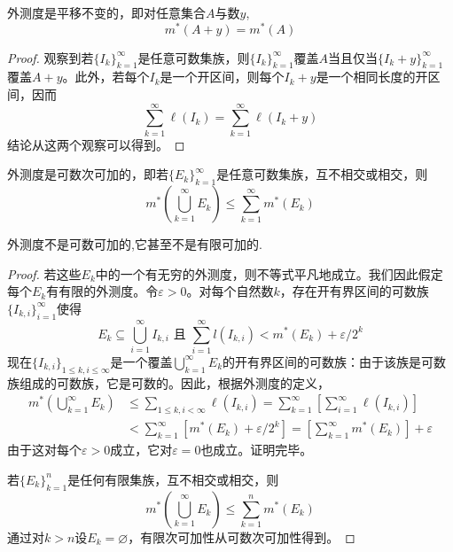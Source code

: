 \documentclass[lang=cn,newtx,10pt,scheme=chinese]{../Template/elegantbook}
\begin{document}
\begin{proposition}[Lebesgue外测度的平移不变性]\label{proposition:Lebesgue外测度的平移不变性}
外测度是平移不变的，即对任意集合\(A\)与数\(y\),
\[m^*(A + y)=m^*(A)\]
\end{proposition}
\begin{proof}
  观察到若\(\{I_k\}_{k = 1}^{\infty}\)是任意可数集族，则\(\{I_k\}_{k = 1}^{\infty}\)覆盖\(A\)当且仅当\(\{I_k + y\}_{k = 1}^{\infty}\)覆盖\(A + y\)。此外，若每个\(I_k\)是一个开区间，则每个\(I_k + y\)是一个相同长度的开区间，因而
\[
\sum_{k = 1}^{\infty}\ell(I_k)=\sum_{k = 1}^{\infty}\ell(I_k + y)
\]
结论从这两个观察可以得到。
\end{proof}

\begin{proposition}[Lebesgue外测度的可数次可加性]\label{proposition:Lebesgue外测度的可数次可加性}
  外测度是可数次可加的，即若\(\{E_k\}_{k = 1}^{\infty}\)是任意可数集族，互不相交或相交，则
\[
m^*\left(\bigcup_{k = 1}^{\infty}E_k\right)\leqslant\sum_{k = 1}^{\infty}m^*(E_k)
\]
\end{proposition}
\begin{remark}
  外测度不是可数可加的,它甚至不是有限可加的.
\end{remark}
\begin{proof}
  若这些\(E_k\)中的一个有无穷的外测度，则不等式平凡地成立。我们因此假定每个\(E_k\)有有限的外测度。令\(\varepsilon>0\)。对每个自然数\(k\)，存在开有界区间的可数族\(\{I_{k,i}\}_{i = 1}^{\infty}\)使得
\[
E_k\subseteq\bigcup_{i = 1}^{\infty}I_{k,i}\text{ 且 }\sum_{i = 1}^{\infty}l(I_{k,i})<m^*(E_k)+\varepsilon/2^k
\]
现在\(\{I_{k,i}\}_{1\leqslant k,i\leqslant\infty}\)是一个覆盖\(\bigcup_{k = 1}^{\infty}E_k\)的开有界区间的可数族：由于该族是可数族组成的可数族，它是可数的。因此，根据外测度的定义，
\begin{align*}
m^*\left(\bigcup_{k = 1}^{\infty}E_k\right)&\leqslant\sum_{1\leqslant k,i<\infty}\ell(I_{k,i})=\sum_{k = 1}^{\infty}\left[\sum_{i = 1}^{\infty}\ell(I_{k,i})\right]\\
&<\sum_{k = 1}^{\infty}\left[m^*(E_k)+\varepsilon/2^k\right]=\left[\sum_{k = 1}^{\infty}m^*(E_k)\right]+\varepsilon
\end{align*}
由于这对每个\(\varepsilon>0\)成立，它对\(\varepsilon = 0\)也成立。证明完毕。

若\(\{E_k\}_{k = 1}^{n}\)是任何有限集族，互不相交或相交，则
\[
m^*\left(\bigcup_{k = 1}^{\infty}E_k\right)\leqslant\sum_{k = 1}^{n}m^*(E_k)
\]
通过对\(k>n\)设\(E_k=\varnothing\)，有限次可加性从可数次可加性得到。
\end{proof}
\end{document}
